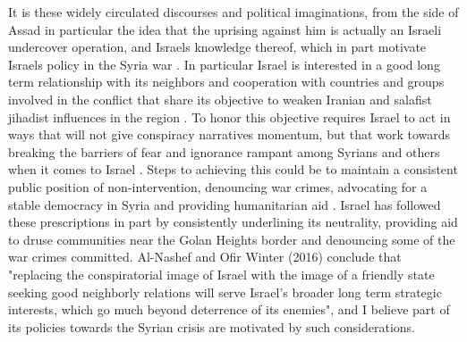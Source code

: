 \documentclass[a4paper]{article}\twocolumn
\begin{document}
It is these widely circulated discourses and political imaginations, from the side of Assad in particular the idea that the uprising against him is actually an Israeli undercover operation, and Israels knowledge thereof, which in part motivate Israels policy in the Syria war \cite{Winter2016}. In particular Israel is interested in a good long term relationship with its neighbors and cooperation with countries and groups involved in the conflict that share its objective to weaken Iranian and salafist jihadist influences in the region \cite{Winter2016}. To honor this objective requires Israel to act in ways that will not give conspiracy narratives momentum, but that work towards breaking the barriers of fear and ignorance rampant among Syrians and others when it comes to Israel \cite{Winter2016}. Steps to achieving this could be to maintain a consistent public position of non-intervention, denouncing war crimes, advocating for a stable democracy in Syria and providing humanitarian aid \cite{Winter2016}. Israel has followed these prescriptions in part by consistently underlining its neutrality, providing aid to druse communities near the Golan Heights border and denouncing some of the war crimes committed. Al-Nashef and Ofir Winter (2016) conclude that "replacing the conspiratorial image of Israel with the image of a friendly state seeking good neighborly relations will serve Israel’s broader long term strategic interests, which go much beyond deterrence of its enemies", and I believe part of its policies towards the Syrian crisis are motivated by such considerations.
\end{document}
